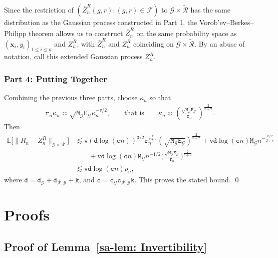 \documentclass[10pt]{article}
\newcommand{\E}{\mathbb{E}}
\newcommand{\bx}{\mathbf{x}}
\newcommand{\F}{\mathcal{F}}
\newcommand{\G}{\mathcal{G}}
\newcommand{\R}{\mathcal{R}}
\newcommand{\Y}{\mathcal{Y}}
\newcommand{\ttc}{\mathtt{c}}
\newcommand{\ttd}{\mathtt{d}}
\newcommand{\ttE}{\mathtt{E}}
\newcommand{\ttk}{\mathtt{k}}
\newcommand{\ttM}{\mathtt{M}}
\newcommand{\ttv}{\mathtt{v}}
\begin{document}
Since the restriction of $(\bar{Z}_n^R(g,r): (g,r)\in\F)$ to $\G\times\tilde{\R}$ has the same distribution as the Gaussian process constructed in Part 1, the Vorob'ev--Berkes--Philipp theorem \citep[Theorem 1.31]{dudley2014uniform} allows us to construct $\bar{Z}_n^R$ on the same probability space as $(\bx_i,y_i)_{1 \leq i \leq n}$ and $Z_n^R$, with $\bar{Z}_n^R$ and $Z_n^R$ coinciding on $\G \times \tilde{\R}$. By an abuse of notation, call this extended Gaussian process $Z_n^R$.

\subsubsection*{Part 4: Putting Together}

Combining the previous three parts, choose $\kappa_n$ so that
\begin{align*}
    \mathtt{r}_n \kappa_n \asymp \sqrt{\ttM_{\G} \ttE_{\G}} \kappa_n^{-v/2},
    \qquad\text{that is}\qquad
    \kappa_n \asymp \left(\frac{\sqrt{\ttM_{\G}\ttE_{\G}}}{\mathtt{r}_n}\right)^{\frac{2}{v+2}}.
\end{align*}
Then
\begin{align*}
    \E \big[\lVert R_n - Z_n^R \rVert_{\G \times \R} \big] & \lesssim \ttv(\ttd\log (\ttc n))^{3/2} \mathtt{r}_n^{\frac{v}{v +2}}(\sqrt{\ttM_{\G}\ttE_{\G}})^{\frac{2}{v+2}} + \ttv\ttd\log(\ttc n) \ttM_{\G} n^{-\frac{v/2}{2+v}} \\
    & \qquad +  \ttv\ttd\log(\ttc n) \ttM_{\G} n^{-1/2} \Big(\frac{\sqrt{\ttM_{\G} \ttE_{\G}}}{\mathtt{r}_n}\Big)^{\frac{2}{v+2}} \\
    & \lesssim \ttv \ttd\log(\ttc n)\rho_n,
\end{align*}
where $\ttd = \ttd_{\G} + \ttd_{\R,\Y} + \ttk$, and $\ttc = \ttc_{\G} \ttc_{\R,\Y} \ttk$. This proves the stated bound.
\qed


\section{Proofs}\label{sa-sec: Proofs}

\subsection{Proof of Lemma~\ref{sa-lem: Invertibility}}
\end{document}
